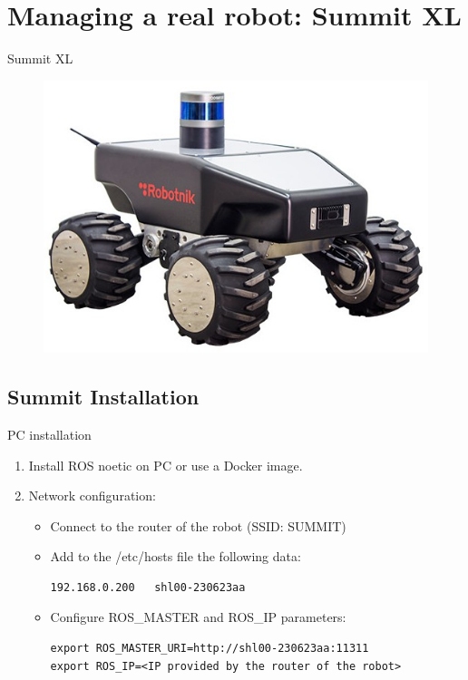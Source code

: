 

\section{Managing a real robot: Summit XL}
\begin{frame}{Summit XL}
\begin{figure}
    \centering
    \includegraphics[scale=0.5]{img/ros/summit-xl.jpg}
\end{figure}
\end{frame}

\subsection{Summit Installation}
\label{subsec:summit_installation}

\begin{frame}[fragile]{PC installation}
\begin{enumerate}
    \item Install ROS noetic on PC or use a Docker image.
    \item Network configuration:
    \begin{itemize}
        \item Connect to the router of the robot (SSID: SUMMIT)
        \item Add to the /etc/hosts file the following data:
\begin{lstlisting}[language=shell]
192.168.0.200   shl00-230623aa
\end{lstlisting}
        \item Configure ROS\_MASTER and ROS\_IP parameters:
\begin{lstlisting}[language=shell]
export ROS_MASTER_URI=http://shl00-230623aa:11311
export ROS_IP=<IP provided by the router of the robot>
\end{lstlisting}
    
    \end{itemize}
\end{enumerate}
\end{frame}

